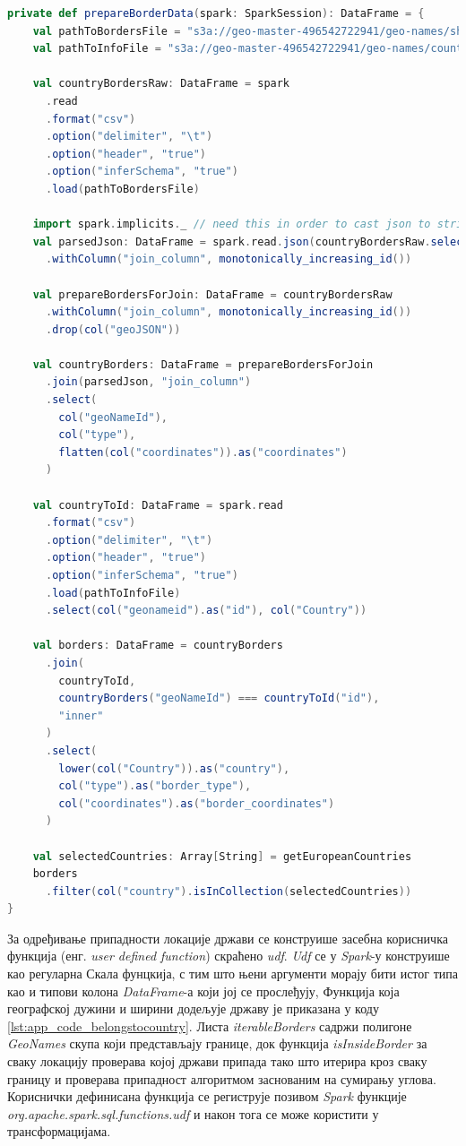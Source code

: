 \documentclass[12pt,oneside]{memoir}
\begin{document}
\begin{lstlisting}[caption={Функција која припрема \textit{DataFrame} у коме се налазе информације о границама држава}, language=Scala, label={lst:app_code_prepare_borders}]
private def prepareBorderData(spark: SparkSession): DataFrame = {
    val pathToBordersFile = "s3a://geo-master-496542722941/geo-names/shapes_all_low.txt"
    val pathToInfoFile = "s3a://geo-master-496542722941/geo-names/country_info.txt"

    val countryBordersRaw: DataFrame = spark
      .read
      .format("csv")
      .option("delimiter", "\t")
      .option("header", "true")
      .option("inferSchema", "true")
      .load(pathToBordersFile)

    import spark.implicits._ // need this in order to cast json to string
    val parsedJson: DataFrame = spark.read.json(countryBordersRaw.select(col("geoJSON")).as[String])
      .withColumn("join_column", monotonically_increasing_id())

    val prepareBordersForJoin: DataFrame = countryBordersRaw
      .withColumn("join_column", monotonically_increasing_id())
      .drop(col("geoJSON"))

    val countryBorders: DataFrame = prepareBordersForJoin
      .join(parsedJson, "join_column")
      .select(
        col("geoNameId"),
        col("type"),
        flatten(col("coordinates")).as("coordinates")
      )

    val countryToId: DataFrame = spark.read
      .format("csv")
      .option("delimiter", "\t")
      .option("header", "true")
      .option("inferSchema", "true")
      .load(pathToInfoFile)
      .select(col("geonameid").as("id"), col("Country"))

    val borders: DataFrame = countryBorders
      .join(
        countryToId,
        countryBorders("geoNameId") === countryToId("id"),
        "inner"
      )
      .select(
        lower(col("Country")).as("country"),
        col("type").as("border_type"),
        col("coordinates").as("border_coordinates")
      )

    val selectedCountries: Array[String] = getEuropeanCountries
    borders
      .filter(col("country").isInCollection(selectedCountries))
}
\end{lstlisting}

За одређивање припадности локације држави се конструише засебна корисничка функција (енг. \textit{user defined function}) скраћено \textit{udf}. \textit{Udf} се у \textit{Spark}-у конструише као регуларна Скала фунцкија, с тим што њени аргументи морају бити истог типа као и типови колона \textit{DataFrame}-а који јој се прослеђују, Функција која географској дужини и ширини додељује државу је приказана у коду \ref{lst:app_code_belongstocountry}. Листа \textit{iterableBorders} садржи полигоне \textit{GeoNames} скупа који представљају границе, док функција \textit{isInsideBorder} за сваку локацију проверава којој држави припада тако што итерира кроз сваку границу и проверава припадност алгоритмом заснованим на сумирању углова. Кориснички дефинисана функција се региструје позивом \textit{Spark} функције \textit{org.apache.spark.sql.functions.udf} и након тога се може користити у трансформацијама.
\end{document}
